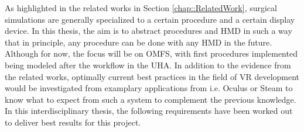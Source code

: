 As highlighted in the related works in Section \ref{chap::RelatedWork}, surgical simulations are generally specialized to a certain procedure and a certain display device.
In this thesis, the aim is to abstract procedures and HMD in such a way that in principle, any procedure can be done with any HMD in the future.
Although for now, the focus will be on OMFS, with first procedures implemented being modeled after the workflow in the UHA.
In addition to the evidence from the related works, optimally current best practices in the field of VR development would be investigated from examplary applications from i.e. Oculus or Steam to know what to expect from such a system to complement the previous knowledge.
In this interdisciplinary thesis, the following requirements have been worked out to deliver best results for this project. 

